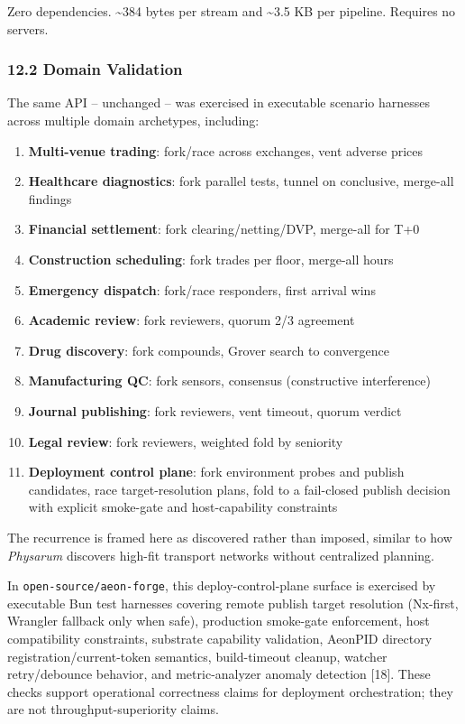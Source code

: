\documentclass[
  11pt,
]{article}
\begin{document}
Zero dependencies. \textasciitilde384 bytes per stream and
\textasciitilde3.5 KB per pipeline. Requires no servers.

\subsubsection{12.2 Domain Validation}\label{domain-validation}

The same API -- unchanged -- was exercised in executable scenario
harnesses across multiple domain archetypes, including:

\begin{enumerate}
\def\labelenumi{\arabic{enumi}.}
\item
  \textbf{Multi-venue trading}: fork/race across exchanges, vent adverse
  prices
\item
  \textbf{Healthcare diagnostics}: fork parallel tests, tunnel on
  conclusive, merge-all findings
\item
  \textbf{Financial settlement}: fork clearing/netting/DVP, merge-all
  for T+0
\item
  \textbf{Construction scheduling}: fork trades per floor, merge-all
  hours
\item
  \textbf{Emergency dispatch}: fork/race responders, first arrival wins
\item
  \textbf{Academic review}: fork reviewers, quorum 2/3 agreement
\item
  \textbf{Drug discovery}: fork compounds, Grover search to convergence
\item
  \textbf{Manufacturing QC}: fork sensors, consensus (constructive
  interference)
\item
  \textbf{Journal publishing}: fork reviewers, vent timeout, quorum
  verdict
\item
  \textbf{Legal review}: fork reviewers, weighted fold by seniority
\item
  \textbf{Deployment control plane}: fork environment probes and publish
  candidates, race target-resolution plans, fold to a fail-closed
  publish decision with explicit smoke-gate and host-capability
  constraints
\end{enumerate}

The recurrence is framed here as discovered rather than imposed, similar
to how \emph{Physarum} discovers high-fit transport networks without
centralized planning.

In \texttt{open-source/aeon-forge}, this deploy-control-plane surface is
exercised by executable Bun test harnesses covering remote publish
target resolution (Nx-first, Wrangler fallback only when safe),
production smoke-gate enforcement, host compatibility constraints,
substrate capability validation, AeonPID directory
registration/current-token semantics, build-timeout cleanup, watcher
retry/debounce behavior, and metric-analyzer anomaly detection {[}18{]}.
These checks support operational correctness claims for deployment
orchestration; they are not throughput-superiority claims.
\end{document}
